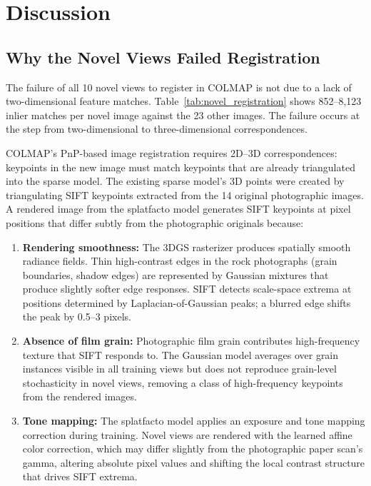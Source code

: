 \documentclass[12pt]{article}
\begin{document}
\section{Discussion}
\label{sec:discussion}

\subsection{Why the Novel Views Failed Registration}
\label{subsec:registration_failure}

The failure of all 10 novel views to register in COLMAP is not due to a lack of two-dimensional feature matches. Table~\ref{tab:novel_registration} shows 852--8,123 inlier matches per novel image against the 23 other images. The failure occurs at the step from two-dimensional to three-dimensional correspondences.

COLMAP's PnP-based image registration requires 2D--3D correspondences: keypoints in the new image must match keypoints that are already triangulated into the sparse model. The existing sparse model's 3D points were created by triangulating SIFT keypoints extracted from the 14 original photographic images. A rendered image from the splatfacto model generates SIFT keypoints at pixel positions that differ subtly from the photographic originals because:

\begin{enumerate}
    \item \textbf{Rendering smoothness:} The 3DGS rasterizer produces spatially smooth radiance fields. Thin high-contrast edges in the rock photographs (grain boundaries, shadow edges) are represented by Gaussian mixtures that produce slightly softer edge responses. SIFT detects scale-space extrema at positions determined by Laplacian-of-Gaussian peaks; a blurred edge shifts the peak by 0.5--3 pixels.
    \item \textbf{Absence of film grain:} Photographic film grain contributes high-frequency texture that SIFT responds to. The Gaussian model averages over grain instances visible in all training views but does not reproduce grain-level stochasticity in novel views, removing a class of high-frequency keypoints from the rendered images.
    \item \textbf{Tone mapping:} The splatfacto model applies an exposure and tone mapping correction during training. Novel views are rendered with the learned affine color correction, which may differ slightly from the photographic paper scan's gamma, altering absolute pixel values and shifting the local contrast structure that drives SIFT extrema.
\end{enumerate}
\end{document}
